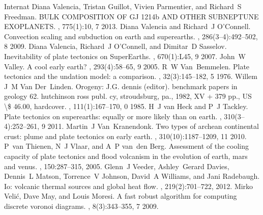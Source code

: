 \documentclass[letterpaper,10pt,english]{jupyterBook}
\begin{document}
\begin{sphinxthebibliography}{Internat}
\sphinxAtStartPar
Diana Valencia, Tristan Guillot, Vivien Parmentier, and Richard S Freedman. BULK COMPOSITION OF GJ 1214b AND OTHER SUB\sphinxhyphen{}NEPTUNE EXOPLANETS. , 775(1):10, 7 2013.
\sphinxAtStartPar
Diana Valencia and Richard J O'Connell. Convection scaling and subduction on earth and super\sphinxhyphen{}earths. , 286(3–4):492–502, 8 2009.
\sphinxAtStartPar
Diana Valencia, Richard J O'Connell, and Dimitar D Sasselov. Inevitability of plate tectonics on Super\sphinxhyphen{}Earths. , 670(1):L45, 9 2007.
\sphinxAtStartPar
John W Valley. A cool early earth? , 293(4):58–65, 9 2005.
\sphinxAtStartPar
R W Van Bemmelen. Plate tectonics and the undation model: a comparison. , 32(3):145–182, 5 1976.
\sphinxAtStartPar
Willem J M Van Der Linden. Orogeny: J.G. dennis (editor). benchmark papers in geology 62. hutchinson ross publ. cy, stroudsburg, pa., 1982, XV + 379 pp., US \textbackslash{}\$ 46.00, hardcover. , 111(1):167–170, 0 1985.
\sphinxAtStartPar
H J van Heck and P J Tackley. Plate tectonics on super\sphinxhyphen{}earths: equally or more likely than on earth. , 310(3–4):252–261, 9 2011.
\sphinxAtStartPar
Martin J Van Kranendonk. Two types of archean continental crust: plume and plate tectonics on early earth. , 310(10):1187–1209, 11 2010.
\sphinxAtStartPar
P van Thienen, N J Vlaar, and A P van den Berg. Assessment of the cooling capacity of plate tectonics and flood volcanism in the evolution of earth, mars and venus. , 150:287–315, 2005.
\sphinxAtStartPar
Glenn J Veeder, Ashley Gerard Davies, Dennis L Matson, Torrence V Johnson, David A Williams, and Jani Radebaugh. Io: volcanic thermal sources and global heat flow. , 219(2):701–722, 2012.
\sphinxAtStartPar
Mirko Velić, Dave May, and Louis Moresi. A fast robust algorithm for computing discrete voronoi diagrams. , 8(3):343–355, 7 2009.

\end{sphinxthebibliography}
\end{document}
